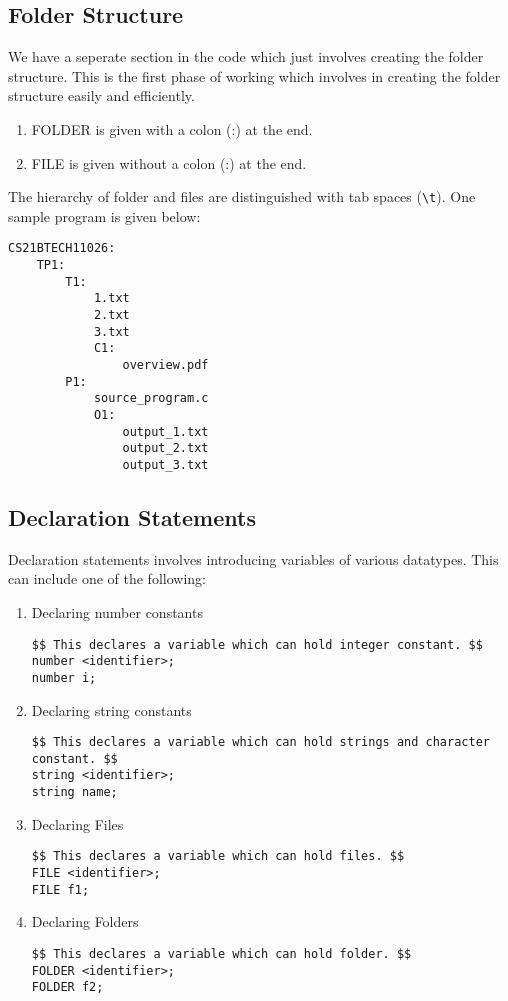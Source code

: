 \documentclass{article}
\begin{document}
\subsection{Folder Structure}
We have a seperate section in the code which just involves creating the folder structure. This is the first phase of working which involves in creating the folder structure easily and efficiently.
\begin{enumerate}
\item FOLDER is given with a colon (:) at the end.
\item FILE is given without a colon (:) at the end.
\end{enumerate}
The hierarchy of folder and files are distinguished with tab spaces (\texttt{\textbackslash t}). One sample program is given below:
\begin{verbatim}
CS21BTECH11026:
    TP1:
        T1:
            1.txt
            2.txt
            3.txt
            C1:
                overview.pdf
        P1:
            source_program.c
            O1:
                output_1.txt
                output_2.txt
                output_3.txt
\end{verbatim}

\subsection{Declaration Statements}
Declaration statements involves introducing variables of various datatypes. This can include one of the following:
\begin{enumerate}
\item Declaring number constants
\begin{verbatim}
$$ This declares a variable which can hold integer constant. $$
number <identifier>;
number i;
\end{verbatim}

\item Declaring string constants
\begin{verbatim}
$$ This declares a variable which can hold strings and character constant. $$
string <identifier>;
string name;
\end{verbatim}

\item Declaring Files
\begin{verbatim}
$$ This declares a variable which can hold files. $$
FILE <identifier>;
FILE f1;
\end{verbatim}

\item Declaring Folders
\begin{verbatim}
$$ This declares a variable which can hold folder. $$
FOLDER <identifier>;
FOLDER f2;
\end{verbatim}
\end{enumerate}
\end{document}
